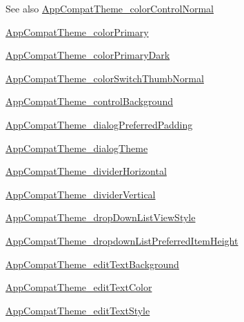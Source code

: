 \begin{DoxySeeAlso}{See also}
\hyperlink{classandroid_1_1support_1_1v7_1_1mediarouter_1_1R_1_1styleable_a5fa81c05a9dc3325bf0d8bb56ae34321}{App\+Compat\+Theme\+\_\+color\+Control\+Normal} 

\hyperlink{classandroid_1_1support_1_1v7_1_1mediarouter_1_1R_1_1styleable_a0c6a69062686746906fdbde03f24524b}{App\+Compat\+Theme\+\_\+color\+Primary} 

\hyperlink{classandroid_1_1support_1_1v7_1_1mediarouter_1_1R_1_1styleable_a68da362e86b61e6a4cd581ac84979e66}{App\+Compat\+Theme\+\_\+color\+Primary\+Dark} 

\hyperlink{classandroid_1_1support_1_1v7_1_1mediarouter_1_1R_1_1styleable_aa3284b705f7b27b8788c23ea647f66df}{App\+Compat\+Theme\+\_\+color\+Switch\+Thumb\+Normal} 

\hyperlink{classandroid_1_1support_1_1v7_1_1mediarouter_1_1R_1_1styleable_a47c5659b0ee16f07cd6f1cf55cd650e3}{App\+Compat\+Theme\+\_\+control\+Background} 

\hyperlink{classandroid_1_1support_1_1v7_1_1mediarouter_1_1R_1_1styleable_a12d698145612528765b887b3bbbe63bb}{App\+Compat\+Theme\+\_\+dialog\+Preferred\+Padding} 

\hyperlink{classandroid_1_1support_1_1v7_1_1mediarouter_1_1R_1_1styleable_ae5022810b719a59e28a020ed0d2689d1}{App\+Compat\+Theme\+\_\+dialog\+Theme} 

\hyperlink{classandroid_1_1support_1_1v7_1_1mediarouter_1_1R_1_1styleable_af1934692686e513b4d05797f7f21f7c8}{App\+Compat\+Theme\+\_\+divider\+Horizontal} 

\hyperlink{classandroid_1_1support_1_1v7_1_1mediarouter_1_1R_1_1styleable_af04d015bffeaa6e33a461f5976092ee7}{App\+Compat\+Theme\+\_\+divider\+Vertical} 

\hyperlink{classandroid_1_1support_1_1v7_1_1mediarouter_1_1R_1_1styleable_a63a97be975b87c1a0d46a0ace55382ec}{App\+Compat\+Theme\+\_\+drop\+Down\+List\+View\+Style} 

\hyperlink{classandroid_1_1support_1_1v7_1_1mediarouter_1_1R_1_1styleable_a3a6ed7fa586db357c9b5385ac2be0ddf}{App\+Compat\+Theme\+\_\+dropdown\+List\+Preferred\+Item\+Height} 

\hyperlink{classandroid_1_1support_1_1v7_1_1mediarouter_1_1R_1_1styleable_a6fda1fd04dd1db6ea57c92f5116e4ccb}{App\+Compat\+Theme\+\_\+edit\+Text\+Background} 

\hyperlink{classandroid_1_1support_1_1v7_1_1mediarouter_1_1R_1_1styleable_a24e96622e17c6e06f00fb84f96e4c62b}{App\+Compat\+Theme\+\_\+edit\+Text\+Color} 

\hyperlink{classandroid_1_1support_1_1v7_1_1mediarouter_1_1R_1_1styleable_a397e422b63e3ca3295e55fd0a548cd24}{App\+Compat\+Theme\+\_\+edit\+Text\+Style} 


\end{DoxySeeAlso}
